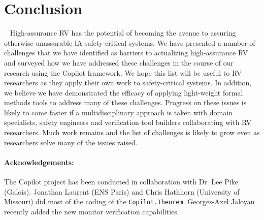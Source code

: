 \section{Conclusion}~\label{sec:conclusion} High-assurance RV has
the potential of becoming the avenue to assuring
otherwise unassurable IA safety-critical systems. We have presented a
number of challenges that we have identified as barriers to
actualizing high-assurance RV and surveyed how we have addressed these
challenges in the course of our research using the Copilot
framework. We hope this list will be useful to RV researchers as they
apply their own work to safety-critical systems.  In addition, we
believe we have demonstrated the efficacy of applying light-weight
formal methods tools to address many of these challenges.  Progress on
these issues is likely to come faster if a multidisciplinary approach
is taken with domain specialists, safety engineers and verification tool
builders collaborating with RV researchers. Much work
remains and the list of challenges is likely to grow even as researchers
solve  many of the issues raised.

\paragraph{Acknowledgements:} The Copilot project  has
been conducted in collaboration with Dr. Lee Pike (Galois).  Jonathan
Laurent (ENS Paris)  and Chris Hathhorn (University of Missouri) did
most of the coding of the {\tt Copilot.Theorem}.   Georges-Axel
Jaloyan  recently added the new  monitor verification capabilities. 